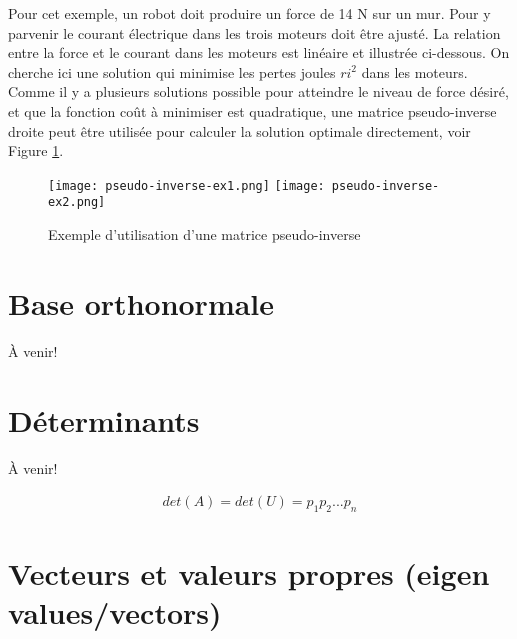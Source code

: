 Pour cet exemple, un robot doit produire un force de 14 N sur un mur. Pour y parvenir le courant électrique dans les trois moteurs doit être ajusté. La relation entre la force et le courant dans les moteurs est linéaire et illustrée ci-dessous. On cherche ici une solution qui minimise les pertes joules $ri^2$ dans les moteurs. Comme il y a plusieurs solutions possible pour atteindre le niveau de force désiré, et que la fonction coût à minimiser est quadratique, une matrice pseudo-inverse droite peut être utilisée pour calculer la solution optimale directement, voir Figure \ref{fig:pseudo-inverse-ex1}.
\begin{figure}[htbp]
	\centering
		\texttt{[image: pseudo-inverse-ex1.png]}
		\texttt{[image: pseudo-inverse-ex2.png]}
	\caption{Exemple d'utilisation d'une matrice pseudo-inverse}
	\label{fig:pseudo-inverse-ex1}
\end{figure}





\section{Base orthonormale}

À venir!

\section{Déterminants}

À venir!

\begin{align}
det(A) = det(U) = p_1 p_2 ... p_n
\end{align}

\section{Vecteurs et valeurs propres (eigen values/vectors)}

